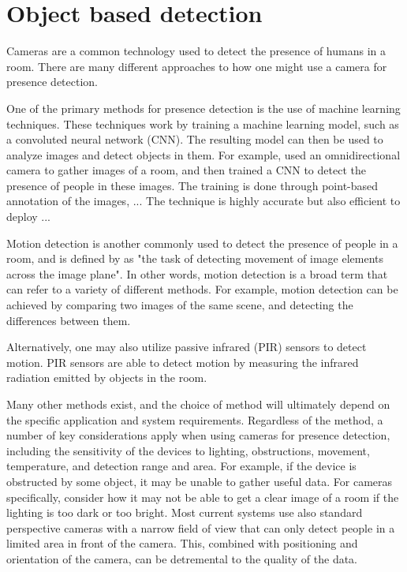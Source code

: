 \section{Object based detection} \label{sec:object-based-detection}
Cameras are a common technology used to detect the presence of humans in a room.
There are many different approaches to how one might use a camera for presence detection.

One of the primary methods for presence detection is the use of machine learning techniques.
These techniques work by training a machine learning model, such as a convoluted neural network (CNN).
The resulting model can then be used to analyze images and detect objects in them.
For example, \citeauthor{FUERTES2022103473} used an omnidirectional camera to gather images of a room, and then trained a CNN to detect the presence of people in these images.
The training is done through point-based annotation of the images, ...
The technique is highly accurate but also efficient to deploy ...
\cite{FUERTES2022103473}

Motion detection is another commonly used to detect the presence of people in a room, and is defined by \citeauthor{ANANDAN1988347} as "the task of detecting movement of image elements across the image plane".
In other words, motion detection is a broad term that can refer to a variety of different methods.
For example, motion detection can be achieved by comparing two images of the same scene, and detecting the differences between them\cite{granath_detecting_nodate}.

Alternatively, one may also utilize passive infrared (PIR) sensors to detect motion.
PIR sensors are able to detect motion by measuring the infrared radiation emitted by objects in the room.\cite{Deiana2014}

Many other methods exist, and the choice of method will ultimately depend on the specific application and system requirements. 
Regardless of the method, a number of key considerations apply when using cameras for presence detection, including the sensitivity of the devices to lighting, obstructions, movement, temperature, and detection range and area.
For example, if the device is obstructed by some object, it may be unable to gather useful data.
For cameras specifically, consider how it may not be able to get a clear image of a room if the lighting is too dark or too bright.
Most current systems use also standard perspective cameras with a narrow field of view that can only detect people in a limited area in front of the camera\cite{FUERTES2022103473}.
This, combined with positioning and orientation of the camera, can be detremental to the quality of the data.\cite{granath_detecting_nodate, tang_occupancy_2020}

